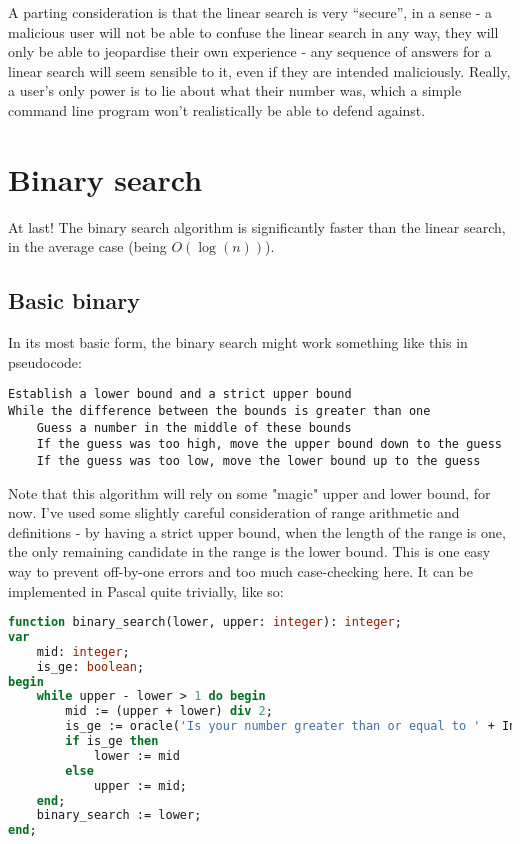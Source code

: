 \documentclass[fleqn,a4paper,11pt]{article}
\begin{document}
    A parting consideration is that the linear search is very ``secure'', in a
    sense - a malicious user will not be able to confuse the linear search in
    any way, they will only be able to jeopardise their own experience - any
    sequence of answers for a linear search will seem sensible to it, even if
    they are intended maliciously. Really, a user's only power is to lie about
    what their number was, which a simple command line program won't
    realistically be able to defend against.

    \section{Binary search}

    At last! The binary search algorithm is significantly faster than the
    linear search, in the average case (being $O(\log(n))$).

    \subsection{Basic binary}

    In its most basic form, the binary search might work something like this in
    pseudocode:

\begin{lstlisting}[caption=Basic binary search pseudocode]
Establish a lower bound and a strict upper bound
While the difference between the bounds is greater than one
    Guess a number in the middle of these bounds
    If the guess was too high, move the upper bound down to the guess
    If the guess was too low, move the lower bound up to the guess
\end{lstlisting}

    Note that this algorithm will rely on some "magic" upper and lower bound,
    for now. I've used some slightly careful consideration of range arithmetic
    and definitions - by having a strict upper bound, when the length of the
    range is one, the only remaining candidate in the range is the lower bound.
    This is one easy way to prevent off-by-one errors and too much
    case-checking here. It can be implemented in Pascal quite trivially, like
    so:

\begin{lstlisting}[language=Pascal, caption=Basic binary search in Pascal, label={lst:binarysearch}]
function binary_search(lower, upper: integer): integer;
var
    mid: integer;
    is_ge: boolean;
begin
    while upper - lower > 1 do begin
        mid := (upper + lower) div 2;
        is_ge := oracle('Is your number greater than or equal to ' + IntToStr(mid) + '? ');
        if is_ge then
            lower := mid
        else
            upper := mid;
    end;
    binary_search := lower;
end;
\end{lstlisting}
\end{document}
